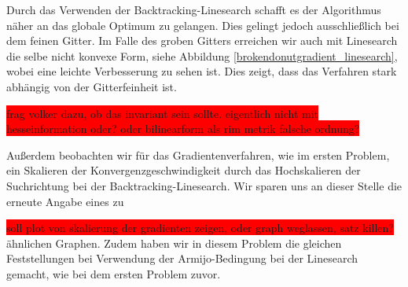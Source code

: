 Durch das Verwenden der Backtracking-Linesearch schafft es der Algorithmus näher an das globale Optimum zu gelangen. Dies gelingt jedoch ausschließlich bei dem feinen Gitter. Im Falle des groben Gitters erreichen wir auch mit Linesearch die selbe nicht konvexe Form, siehe Abbildung \ref{brokendonutgradient_linesearch}, wobei eine leichte Verbesserung zu sehen ist. Dies zeigt, dass das Verfahren stark abhängig von der Gitterfeinheit ist.

\colorbox{red}{frag volker dazu, ob das invariant sein sollte. eigentlich nicht mit hesseinformation oder? oder bilinearform als rim metrik falsche ordnung?}

Außerdem beobachten wir für das Gradientenverfahren, wie im ersten Problem, ein Skalieren der Konvergenzgeschwindigkeit durch das Hochskalieren der Suchrichtung bei der Backtracking-Linesearch. Wir sparen uns an dieser Stelle die erneute Angabe eines zu 

\colorbox{red}{soll plot von skalierung der gradienten zeigen, oder graph weglassen, satz killen?} ähnlichen Graphen.
Zudem haben wir in diesem Problem die gleichen Feststellungen bei Verwendung der Armijo-Bedingung bei der Linesearch gemacht, wie bei dem ersten Problem zuvor.

